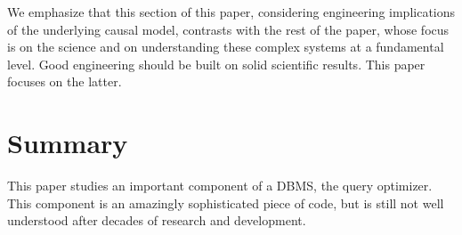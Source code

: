 \documentclass[prodmode,acmtods]{acmsmall}
\begin{document}
We emphasize that this section of this paper, considering engineering
implications of the underlying causal model, contrasts with the rest of the
paper, whose focus is on the science and on understanding these complex
systems at a fundamental level.  Good engineering should be built on solid
scientific results. This paper focuses on the latter.

\section{Summary}\label{sec:summary}

This paper studies an important
component of a \hbox{DBMS}, the query optimizer. This component is an amazingly
sophisticated piece of code, but is still not well understood after decades
of research and development.
\end{document}
